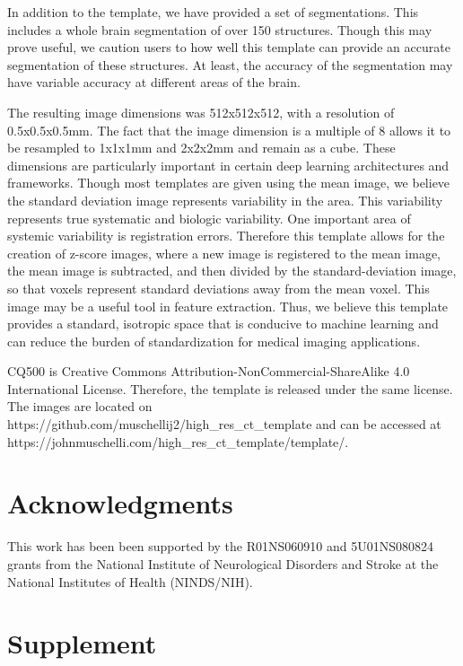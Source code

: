 \documentclass[]{elsarticle} %
\begin{document}
In addition to the template, we have provided a set of segmentations. This includes a whole brain segmentation of over 150 structures. Though this may prove useful, we caution users to how well this template can provide an accurate segmentation of these structures. At least, the accuracy of the segmentation may have variable accuracy at different areas of the brain.

The resulting image dimensions was 512x512x512, with a resolution of 0.5x0.5x0.5mm. The fact that the image dimension is a multiple of 8 allows it to be resampled to 1x1x1mm and 2x2x2mm and remain as a cube. These dimensions are particularly important in certain deep learning architectures and frameworks. Though most templates are given using the mean image, we believe the standard deviation image represents variability in the area. This variability represents true systematic and biologic variability. One important area of systemic variability is registration errors. Therefore this template allows for the creation of z-score images, where a new image is registered to the mean image, the mean image is subtracted, and then divided by the standard-deviation image, so that voxels represent standard deviations away from the mean voxel. This image may be a useful tool in feature extraction. Thus, we believe this template provides a standard, isotropic space that is conducive to machine learning and can reduce the burden of standardization for medical imaging applications.

CQ500 is Creative Commons Attribution-NonCommercial-ShareAlike 4.0 International License. Therefore, the template is released under the same license. The images are located on https://github.com/muschellij2/high\_res\_ct\_template and can be accessed at https://johnmuschelli.com/high\_res\_ct\_template/template/.

\hypertarget{acknowledgments}{%
\section{Acknowledgments}\label{acknowledgments}}

This work has been been supported by the R01NS060910 and 5U01NS080824 grants from the National Institute of Neurological Disorders and Stroke at the National Institutes of Health (NINDS/NIH).

\hypertarget{supplement}{%
\section{Supplement}\label{supplement}}
\end{document}

